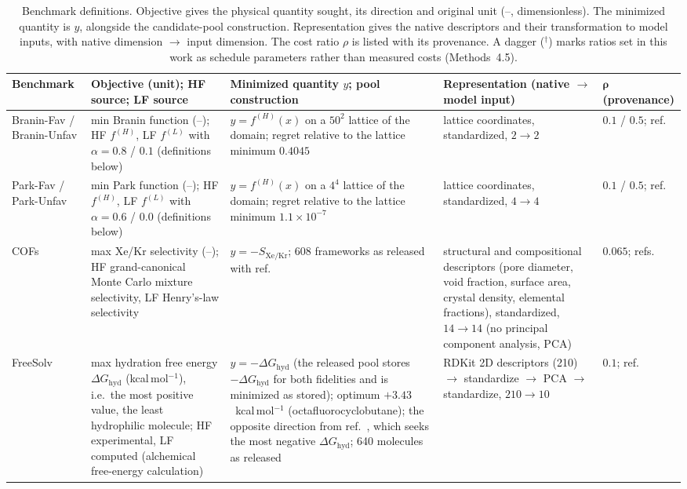 \begin{table}[h]
\centering
\footnotesize
\caption{Benchmark definitions. Objective gives the physical quantity sought, its direction and original unit (--, dimensionless). The minimized quantity is $y$, alongside the candidate-pool construction. Representation gives the native descriptors and their transformation to model inputs, with native dimension $\to$ input dimension. The cost ratio $\rho$ is listed with its provenance. A dagger ($^{\dagger}$) marks ratios set in this work as schedule parameters rather than measured costs (Methods~4.5).}
\label{supptab:benchmark_definitions}
\setlength{\tabcolsep}{4pt}%
\begin{tabular}{@{}>{\raggedright\arraybackslash}p{}>{\raggedright\arraybackslash}p{}>{\raggedright\arraybackslash}p{}>{\raggedright\arraybackslash}p{}>{\raggedright\arraybackslash}p{}@{}}
\toprule
\textbf{Benchmark} & \textbf{Objective (unit); HF source; LF source} & \textbf{Minimized quantity $y$; pool construction} & \textbf{Representation (native $\to$ model input)} & $\boldsymbol{\rho}$ \textbf{(provenance)} \\
\midrule
Branin-Fav / Branin-Unfav & min Branin function (--); HF $f^{(H)}$, LF $f^{(L)}$ with $\alpha = 0.8$ / $0.1$ (definitions below) & $y = f^{(H)}(x)$ on a $50^2$ lattice of the domain; regret relative to the lattice minimum $0.4045$ & lattice coordinates, standardized, $2 \to 2$ & $0.1$ / $0.5$; ref.~\citep{sabanza2025best} \\
\addlinespace
Park-Fav / Park-Unfav & min Park function (--); HF $f^{(H)}$, LF $f^{(L)}$ with $\alpha = 0.6$ / $0.0$ (definitions below) & $y = f^{(H)}(x)$ on a $4^4$ lattice of the domain; regret relative to the lattice minimum $1.1\times10^{-7}$ & lattice coordinates, standardized, $4 \to 4$ & $0.1$ / $0.5$; ref.~\citep{sabanza2025best} \\
\addlinespace
COFs & max Xe/Kr selectivity (--); HF grand-canonical Monte Carlo mixture selectivity, LF Henry's-law selectivity~\citep{gantzler2023multifidelity} & $y = -S_{\mathrm{Xe/Kr}}$; 608 frameworks as released with ref.~\citep{sabanza2025best} & 14 structural and compositional descriptors (pore diameter, void fraction, surface area, crystal density, elemental fractions), standardized, $14 \to 14$ (no principal component analysis, PCA) & $0.065$; refs.~\citep{gantzler2023multifidelity,sabanza2025best} \\
\addlinespace
FreeSolv & max hydration free energy $\Delta G_{\mathrm{hyd}}$ (kcal\,mol$^{-1}$), i.e.\ the most positive value, the least hydrophilic molecule; HF experimental, LF computed (alchemical free-energy calculation)~\citep{mobley2014freesolv} & $y = -\Delta G_{\mathrm{hyd}}$ (the released pool stores $-\Delta G_{\mathrm{hyd}}$ for both fidelities and is minimized as stored); optimum $+3.43$~kcal\,mol$^{-1}$ (octafluorocyclobutane); the opposite direction from ref.~\citep{sabanza2025best}, which seeks the most negative $\Delta G_{\mathrm{hyd}}$; 640 molecules as released & RDKit 2D descriptors (210) $\to$ standardize $\to$ PCA $\to$ standardize, $210 \to 10$ & $0.1$; ref.~\citep{sabanza2025best} \\

\end{tabular}
\end{table}
